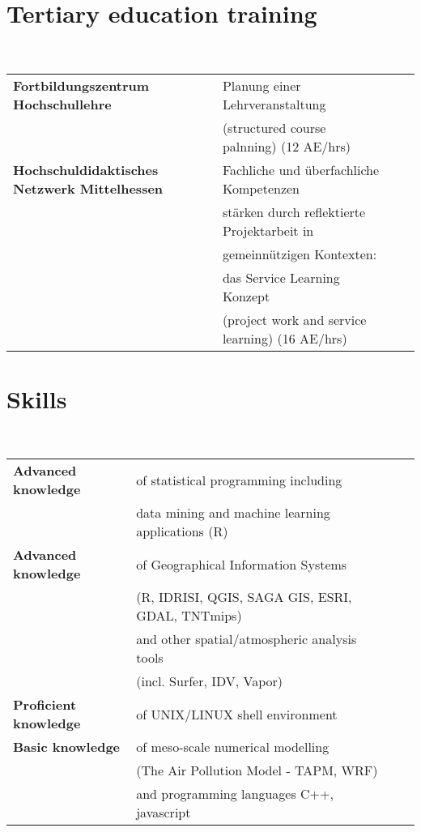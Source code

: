 \documentclass[a4paper,11pt]{article}
\begin{document}
\section{Tertiary education training}
\hrulefill \\
\begin{tabular}{llll} \\
\textbf{Fortbildungszentrum Hochschullehre} & Planung einer Lehrveranstaltung\\
											& (structured course palnning) (12 AE/hrs)\\
\textbf{Hochschuldidaktisches Netzwerk Mittelhessen} & Fachliche und \"uberfachliche Kompetenzen\\
			& st\"arken durch reflektierte Projektarbeit in\\
			& gemeinn\"utzigen Kontexten:\\
			& das Service Learning Konzept\\
			& (project work and service learning) (16 AE/hrs)
\end{tabular}

\pagebreak{}
\section{Skills}
\hrulefill \\
\begin{tabular}{llll} \\
\textbf{Advanced knowledge} & of statistical programming including \\
							& data mining and machine learning applications (R)\\
\textbf{Advanced knowledge} & of Geographical Information Systems\\
				   & (R, IDRISI, QGIS, SAGA GIS, ESRI, GDAL, TNTmips)\\
				   & and other spatial/atmospheric analysis tools\\
				   & (incl. Surfer, IDV, Vapor)\\
\textbf{Proficient knowledge} & of UNIX/LINUX shell environment\\
\textbf{Basic knowledge} & of meso-scale numerical modelling\\
				   & (The Air Pollution Model - TAPM, WRF)\\
				   & and programming languages C++, javascript\\
\end{tabular}
\linebreak{}
\end{document}
